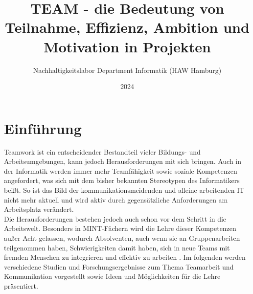 \documentclass[a4paper]{article}
\title{TEAM - die Bedeutung von Teilnahme, Effizienz, Ambition und Motivation in Projekten}
\author{Nachhaltigkeitslabor Department Informatik (HAW Hamburg)}
\date{2024}
\newcommand{\komm}[1]{{ \color{blue}}}%
\begin{document}
\maketitle

\section{Einführung}


Teamwork ist ein entscheidender Bestandteil vieler Bildungs- und Arbeitsumgebungen, kann jedoch Herausforderungen mit sich bringen. Auch in der Informatik werden immer mehr Teamfähigkeit sowie soziale Kompetenzen angefordert, was sich mit dem bisher bekannten Stereotypen des Informatikers beißt. So ist das Bild der kommunikationsmeidenden und alleine arbeitenden IT nicht mehr aktuell und wird aktiv durch gegensätzliche Anforderungen am Arbeitsplatz verändert.\komm{welche Eigenschaften?}\\
Die Herausforderungen bestehen jedoch auch schon vor dem Schritt in die Arbeitswelt. Besonders in MINT-Fächern wird die Lehre dieser Kompetenzen außer Acht gelassen, wodurch Absolventen, auch wenn sie an Gruppenarbeiten teilgenommen haben, Schwierigkeiten damit haben, sich in neue Teams mit fremden Menschen zu integrieren und effektiv zu arbeiten \cite{teamwork_teaching_engineering_china}. 
\komm{missglückte Teamarbeit äußert sich in diskriminierendem Verhalten? Quellen?}
Im folgenden werden verschiedene Studien und Forschungsergebnisse zum Thema Teamarbeit und Kommunikation vorgestellt sowie Ideen und Möglichkeiten für die Lehre präsentiert.\\
\end{document}
